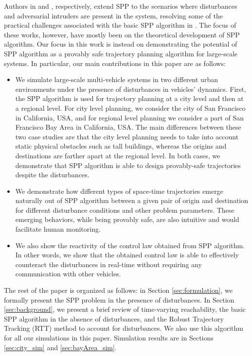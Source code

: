 Authors in \cite{Bansal2017} and \cite{chen2016robust}, respectively, extend SPP to the scenarios where disturbances and adversarial intruders are present in the system, resolving some of the practical challenges associated with the basic SPP algorithm in \cite{Chen15c}. The focus of these works, however, have mostly been on the theoretical development of SPP algorithm. Our focus in this work is instead on demonstrating the potential of SPP algorithm as a provably safe trajectory planning algorithm for large-scale systems. In particular, our main contributions in this paper are as follows:
\begin{itemize}
\item We simulate large-scale multi-vehicle systems in two different urban environments under the presence of disturbances in vehicles' dynamics. First, the SPP algorithm is used for trajectory planning at a city level and then at a regional level. For city level planning, we consider the city of San Francisco in California, USA, and for regional level planning we consider a part of San Francisco Bay Area in California, USA. The main differences between these two case studies are that the city level planning needs to take into account static physical obstacles such as tall buildings, whereas the origins and destinations are farther apart at the regional level. In both cases, we demonstrate that SPP algorithm is able to design provably-safe trajectories despite the disturbances.
\item We demonstrate how different types of space-time trajectories emerge naturally out of SPP algorithm between a given pair of origin and destination for different disturbance conditions and other problem parameters. These emerging behaviors, while being provably safe, are also intuitive and would facilitate human monitoring. 
\item We also show the reactivity of the control law obtained from SPP algorithm. In other words, we show that the obtained control law is able to effectively counteract the disturbances in real-time without requiring any communication with other vehicles.
\end{itemize}

The rest of the paper is organized as follows: in Section \ref{sec:formulation}, we formally present the SPP problem in the presence of disturbances. In Section \ref{sec:background}, we present a brief review of time-varying reachability, the basic SPP algorithm \cite{Chen15c} in the absence of disturbances, and the Robust Trajectory Tracking (RTT) method \cite{Bansal2017} to account for disturbances. We also use this algorithm for all our simulations in this paper. Simulation results are in Sections \ref{sec:city_sim} and \ref{sec:bayArea_sim}.